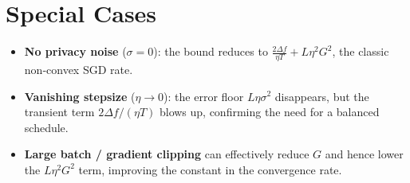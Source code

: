 \documentclass{article}
\begin{document}
\section*{Special Cases}
\begin{itemize}
\item \textbf{No privacy noise} ($\sigma=0$): the bound reduces to
      $\frac{2\Delta f}{\eta T}+L\eta^{2}G^{2}$, the classic non‑convex SGD rate.
\item \textbf{Vanishing stepsize} ($\eta\to0$): the error floor $L\eta\sigma^{2}$
      disappears, but the transient term $2\Delta f/(\eta T)$ blows up,
      confirming the need for a balanced schedule.
\item \textbf{Large batch / gradient clipping} can effectively reduce $G$
      and hence lower the $L\eta^{2}G^{2}$ term, improving the constant in
      the convergence rate.
\end{itemize}
\end{document}
